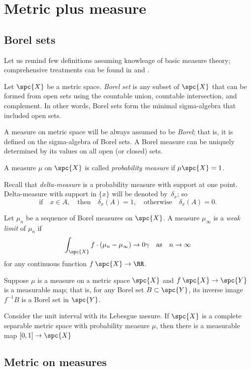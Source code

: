 \chapter{Metric plus measure}

\section{Borel sets}

Let us remind few definitions assuming knowleage of basic measure theory;
comprehensive treatments can be found in \cite{billingsley} and \cite{bogachev}.

Let $\spc{X}$ be a metric space.
\emph{Borel set} is any subset of $\spc{X}$ that can be formed from open sets using the countable union, countable intersection, and complement.
In other words, Borel sets form the minimal sigma-algebra that included open sets.

A measure on metric space will be always assumed to be \emph{Borel};
that is, it is defined on the sigma-algebra of Borel sets.
A Borel measure can be uniquely determined by its values on all open (or closed) sets.

A measure $\mu$ on $\spc{X}$ is called \emph{probability measure} if $\mu\spc{X}=1$.

Recall that \emph{delta-measure} is a probability measure with support at one point.
Delta-measure with support in $\{x\}$ will be denoted by~$\delta_{x}$; so
\[\text{if}\quad x\in A,\quad\text{then}\quad \delta_x(A)=1,\quad\text{otherwise}\quad\delta_x(A)=0.\]

Let $\mu_n$ be a sequence of Borel measures on $\spc{X}$.
A measure $\mu_\infty$ is a \emph{weak limit} of $\mu_n$ if 
\[\int_{\spc{X}}f\cdot(\mu_n-\mu_\infty)\to0\gamma
\quad\text{as}\quad
n\to\infty
\]
for any continuous function $f\:\spc{X}\to \RR$.

Suppose $\mu$ is a measure on a metric space $\spc{X}$ and $f\:\spc{X}\to \spc{Y}$ is a measurable map;
that is, for any Borel set $B\subset \spc{Y}$, its inverse image $f^{-1}B$ is a Borel set in $\spc{Y}$.

Consider the unit interval with its Lebesgue mesure.
If $\spc{X}$ is a complete separable metric space with probability measure $\mu$, then there is a measurable map $[0,1]\to \spc{X}$

\section{Metric on measures}

